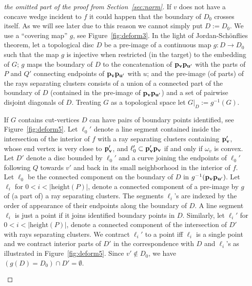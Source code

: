 \documentclass{llncs}
\def\length{\mathrm{height}}
\begin{document}
\begin{proof}[the omitted part of the proof from Section~\ref{sec:norm}]
  If $v$ does not have a concave wedge incident to $f$ it could happen that the boundary of $D_0$ crosses itself. As we will see later due to this reason we cannot simply put $D:=D_0$.
We use a ``covering map'' $g$, see Figure~\ref{fig:deform3}.
In the light of Jordan-Sch\"onflies theorem,
  let a topological disc $D$ be a pre-image of a continuous  map  $g:D \rightarrow D_0$ such that the map $g$ is injective when restricted (in the target) to the embedding of $G$;
$g$ maps the boundary of $D$ to the concatenation of ${\bf p_{v}}{\bf p_{u'}}$
with the parts of $P$ and $Q'$ connecting endpoints of ${\bf p_{v}}{\bf p_{u'}}$  with $u$;
and the pre-image (of  parts) of the rays separating clusters
 consists of a union of a connected part of the boundary of $D$ 
 (contained in the pre-image of ${\bf p_{v}}{\bf p_{u'}}$) and
a set of pairwise disjoint diagonals of $D$.
Treating $G$ as a topological space let $G|_D:=g^{-1}(G)$.  

 If $G$ contains cut-vertices $D$ can have pairs of boundary points identified, see Figure~\ref{fig:deform5}.
Let $\ell_0'$ denote  a line segment contained inside the intersection of the interior of $f$ with a ray separating clusters containing ${\bf p_v'}$, whose end vertex is very close to ${\bf p_v'}$, and $\ell_0'\subset{\bf p_v'p_v}$ if and only if $\omega_v$ is convex. Let $D'$ denote a disc bounded by $\ell_0'$ and a curve 
joining the endpoints of $\ell_0'$ following $Q$ towards $v'$ and back in its small neighborhood in the interior of $f$.
Let $\ell_0$ be the connected component on the boundary of $D$ in $g^{-1}({\bf p_vp_{u'}})$.
Let $\ell_i$ for $0<i<|\length(P)|$, denote a connected component of a pre-image by $g$ of (a part of) a ray separating clusters. The segments 
$\ell_i$'s are indexed by the order of appearance of their endpoints along the boundary of $D$.
A line segment $\ell_i$ is just a point if it joins identified boundary points in $D$.
Similarly, let $\ell_i'$ for $0<i<|\length(P)|$, denote a connected component of the 
intersection of $D'$ with rays separating clusters.
We contract $\ell_i'$ to a point iff $\ell_i$ is a single point
and we  contract  interior parts of $D'$ in the correspondence with $D$ and $\ell_i$'s as illustrated in Figure~\ref{fig:deform5}. Since $v'\not\in D_0$, we have $(g(D)=D_0)\cap D' = \emptyset$.

 
 

 \begin{figure}[h]
  \centering
\centering
{}
    	\hspace{3px}


\end{figure}
\end{proof}
\end{document}
